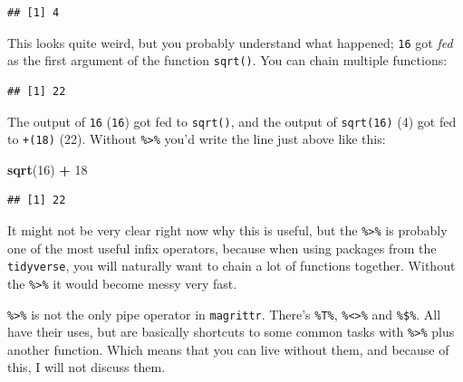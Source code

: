 \documentclass[]{gitbook}
\newenvironment{Shaded}{\begin{snugshade}}{\end{snugshade}}
\newcommand{\DataTypeTok}[1]{\textcolor[rgb]{0.13,0.29,0.53}{#1}}
\newcommand{\DecValTok}[1]{\textcolor[rgb]{0.00,0.00,0.81}{#1}}
\newcommand{\KeywordTok}[1]{\textcolor[rgb]{0.13,0.29,0.53}{\textbf{#1}}}
\newcommand{\NormalTok}[1]{#1}
\newcommand{\OperatorTok}[1]{\textcolor[rgb]{0.81,0.36,0.00}{\textbf{#1}}}
\newcommand{\StringTok}[1]{\textcolor[rgb]{0.31,0.60,0.02}{#1}}
\theoremstyle{definition}
\theoremstyle{definition}
\theoremstyle{definition}
\theoremstyle{remark}
\begin{document}
\begin{Shaded}
\end{Shaded}

\begin{verbatim}
## [1] 4
\end{verbatim}

This looks quite weird, but you probably understand what happened;
\texttt{16} got \emph{fed} as the first argument of the function
\texttt{sqrt()}. You can chain multiple functions:

\begin{Shaded}
\end{Shaded}

\begin{verbatim}
## [1] 22
\end{verbatim}

The output of \texttt{16} (\texttt{16}) got fed to \texttt{sqrt()}, and
the output of \texttt{sqrt(16)} (4) got fed to \texttt{+(18)} (22).
Without \texttt{\%\textgreater{}\%} you'd write the line just above like
this:

\begin{Shaded}
\begin{Highlighting}[]
\KeywordTok{sqrt}\NormalTok{(}\DecValTok{16}\NormalTok{) }\OperatorTok{+}\StringTok{ }\DecValTok{18}
\end{Highlighting}
\end{Shaded}

\begin{verbatim}
## [1] 22
\end{verbatim}

It might not be very clear right now why this is useful, but the
\texttt{\%\textgreater{}\%} is probably one of the most useful infix
operators, because when using packages from the \texttt{tidyverse}, you
will naturally want to chain a lot of functions together. Without the
\texttt{\%\textgreater{}\%} it would become messy very fast.

\texttt{\%\textgreater{}\%} is not the only pipe operator in
\texttt{magrittr}. There's \texttt{\%T\%},
\texttt{\%\textless{}\textgreater{}\%} and \texttt{\%\$\%}. All have
their uses, but are basically shortcuts to some common tasks with
\texttt{\%\textgreater{}\%} plus another function. Which means that you
can live without them, and because of this, I will not discuss them.
\end{document}
